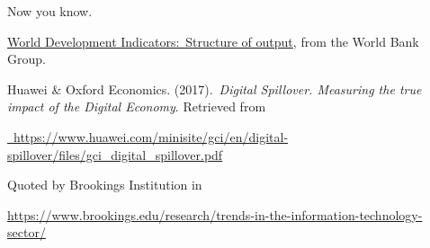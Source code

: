 \begin{multicols}{2}
Now you know. 

\begin{thebibliography}{99}

 \underline{World Development Indicators: Structure of output}, from the World Bank Group.

 Huawei \& Oxford Economics. (2017). \textit{Digital Spillover. Measuring the true impact of the Digital Economy}. Retrieved from

\url{ https://www.huawei.com/minisite/gci/en/digital-spillover/files/gci_digital_spillover.pdf}

Quoted by Brookings Institution in

\url{https://www.brookings.edu/research/trends-in-the-information-technology-sector/}

\end{thebibliography}


  
\end{multicols}



